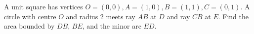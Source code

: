 A unit square has vertices $ O=(0,0),A=(1,0),B=(1,1),C=(0,1)$. A circle with centre $ O $ and radius 2 meets ray $ AB $ at $ D $ and ray $ CB $ at $ E $. Find the area bounded by $ DB $, $ BE $, and the minor arc $ ED $.
